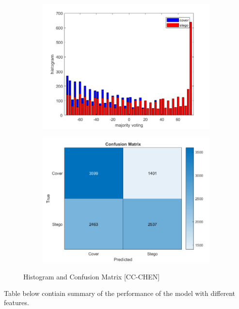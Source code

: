 \begin{figure}[H]
    \begin{subfigure}[b]{0.5\textwidth}
        \includegraphics[width=\textwidth]{img/histochen.png}
    \end{subfigure}
    \hfill
    \begin{subfigure}[b]{0.5\textwidth}
        \includegraphics[width=\textwidth]{img/confusionChen.png}
    \end{subfigure}
    \caption{Histogram and Confusion Matrix [CC-CHEN]}
\end{figure}
\begin{flushleft}
Table below contiain summary of the performance of the model with different features.
\end{flushleft}
